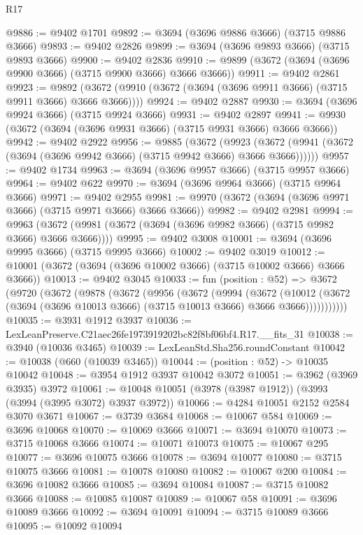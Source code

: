 \begin{lexlean}{R17}
\begin{coremodule}
@9886 := @9402 @1701
@9892 := @3694 (@3696 @9886 @3666) (@3715 @9886 @3666)
@9893 := @9402 @2826
@9899 := @3694 (@3696 @9893 @3666) (@3715 @9893 @3666)
@9900 := @9402 @2836
@9910 := @9899 (@3672 (@3694 (@3696 @9900 @3666) (@3715 @9900 @3666) @3666 @3666))
@9911 := @9402 @2861
@9923 := @9892 (@3672 (@9910 (@3672 (@3694 (@3696 @9911 @3666) (@3715 @9911 @3666) @3666 @3666))))
@9924 := @9402 @2887
@9930 := @3694 (@3696 @9924 @3666) (@3715 @9924 @3666)
@9931 := @9402 @2897
@9941 := @9930 (@3672 (@3694 (@3696 @9931 @3666) (@3715 @9931 @3666) @3666 @3666))
@9942 := @9402 @2922
@9956 := @9885
    (@3672
      (@9923 (@3672 (@9941 (@3672 (@3694 (@3696 @9942 @3666) (@3715 @9942 @3666) @3666 @3666))))))
@9957 := @9402 @1734
@9963 := @3694 (@3696 @9957 @3666) (@3715 @9957 @3666)
@9964 := @9402 @622
@9970 := @3694 (@3696 @9964 @3666) (@3715 @9964 @3666)
@9971 := @9402 @2955
@9981 := @9970 (@3672 (@3694 (@3696 @9971 @3666) (@3715 @9971 @3666) @3666 @3666))
@9982 := @9402 @2981
@9994 := @9963 (@3672 (@9981 (@3672 (@3694 (@3696 @9982 @3666) (@3715 @9982 @3666) @3666 @3666))))
@9995 := @9402 @3008
@10001 := @3694 (@3696 @9995 @3666) (@3715 @9995 @3666)
@10002 := @9402 @3019
@10012 := @10001 (@3672 (@3694 (@3696 @10002 @3666) (@3715 @10002 @3666) @3666 @3666))
@10013 := @9402 @3045
@10033 := fun (position : @52) =>
  @3672
    (@9720
      (@3672
        (@9878
          (@3672
            (@9956
              (@3672
                (@9994
                  (@3672
                    (@10012
                      (@3672 (@3694 (@3696 @10013 @3666) (@3715 @10013 @3666) @3666 @3666)))))))))))
@10035 := @3931 @1912 @3937
@10036 := LexLeanPreserve.C21aec26fe1973919202bc82f8bf06bf4.R17.__fits_31
@10038 := @3940 (@10036 @3465)
@10039 := LexLeanStd.Sha256.roundConstant
@10042 := @10038 (@660 (@10039 @3465))
@10044 := (position : @52) -> @10035 @10042
@10048 := @3954 @1912 @3937 @10042 @3072
@10051 := @3962 (@3969 @3935) @3972
@10061 := @10048 @10051 (@3978 (@3987 @1912)) (@3993 (@3994 (@3995 @3072) @3937 @3972))
@10066 := @4284 @10051 @2152 @2584 @3070 @3671
@10067 := @3739 @3684
@10068 := @10067 @584
@10069 := @3696 @10068
@10070 := @10069 @3666
@10071 := @3694 @10070
@10073 := @3715 @10068 @3666
@10074 := @10071 @10073
@10075 := @10067 @295
@10077 := @3696 @10075 @3666
@10078 := @3694 @10077
@10080 := @3715 @10075 @3666
@10081 := @10078 @10080
@10082 := @10067 @200
@10084 := @3696 @10082 @3666
@10085 := @3694 @10084
@10087 := @3715 @10082 @3666
@10088 := @10085 @10087
@10089 := @10067 @58
@10091 := @3696 @10089 @3666
@10092 := @3694 @10091
@10094 := @3715 @10089 @3666
@10095 := @10092 @10094

\end{coremodule}
\end{lexlean}
